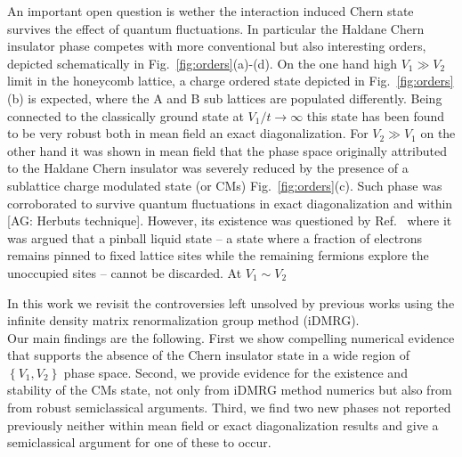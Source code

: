 \documentclass[aps,prx,10pt,twocolumn,floatfix,superscriptaddress,showpacs,numerical,footinbib]{revtex4-1}
\newcommand{\noteAG}[1]{{\color{blue} [AG: #1]}}
\begin{document}
An important open question is wether the interaction induced Chern state survives the effect of quantum fluctuations.
%
In particular the Haldane Chern insulator phase competes with more conventional but also interesting orders, 
depicted schematically in Fig.~\ref{fig:orders}(a)-(d).
%
On the one hand high $V_{1} \gg V_{2}$ limit in the honeycomb lattice, a charge ordered state depicted in Fig.~\ref{fig:orders}(b) is expected, 
where the A and B sub lattices are populated differently.
%
Being connected to the classically ground state at $V_{1}/t \to \infty$ this state has been found to be very robust both in mean field an exact diagonalization.
%
For $V_{2}\gg V_{1}$ on the other hand it was shown in mean field that the phase space originally attributed to the Haldane Chern insulator 
was severely reduced by the presence of a sublattice charge modulated state (or CMs) Fig.~\ref{fig:orders}(c).
%
Such phase was corroborated to survive quantum fluctuations in exact diagonalization \cite{us} and within \noteAG{Herbuts technique}.
%
However, its existence was questioned by Ref.~\cite{} where it was argued that a pinball liquid state -- a state where a fraction of electrons remains pinned to fixed lattice sites while the remaining fermions explore the unoccupied sites -- cannot be discarded. 
%
At $V_{1}\sim V_{2}$




%
In this work we revisit the controversies left unsolved by previous works using the infinite density matrix renormalization group method (iDMRG). \\
%
Our main findings are the following. 
%
First we show compelling numerical evidence that supports the absence of the Chern insulator state in a wide region of $\left\lbrace V_{1},V_{2}\right\rbrace$ phase space.
%
Second, we provide evidence for the existence and stability of the CMs state, not only from iDMRG method numerics but also from
from robust semiclassical arguments.
%
Third, we find two new phases not reported previously neither within mean field or exact diagonalization results and give a semiclassical argument for one 
of these to occur.
\end{document}
